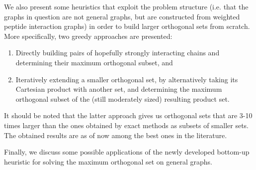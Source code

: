 \documentclass[a4paper]{scrartcl}
\begin{document}
	We also present some heuristics that exploit the problem structure (i.e. that the graphs in question are not general graphs, but are constructed from weighted peptide interaction graphs) in order to build larger orthogonal sets from scratch. More specifically, two greedy approaches are presented: 
	\begin{enumerate}
		\item Directly building pairs of hopefully strongly interacting chains and determining their maximum orthogonal subset, and
		\item Iteratively extending a smaller orthogonal set, by alternatively taking its Cartesian product with another set, and determining the maximum orthogonal subset of the (still moderately sized) resulting product set.
	\end{enumerate} 
	It should be noted that the latter approach gives us orthogonal sets that are 3-10 times larger than the ones obtained by exact methods as subsets of smaller sets. The obtained results are as of now among the best ones in the literature.
	
	Finally, we discuss some possible applications of the newly developed bottom-up heuristic for solving the maximum orthogonal set on general graphs.
	
	
	
\end{document}
